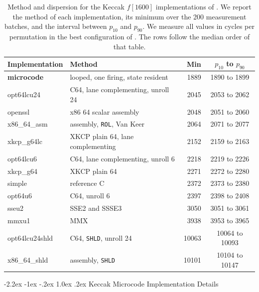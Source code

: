 \documentclass[journal=tches,submission]{iacrtrans}
\makeatletter
\renewcommand\subsection{\@startsection{subsection}{2}{\z@}%
      {-2.2ex \@plus -1ex \@minus -.2ex}%
      {1.0ex \@plus .2ex}%
      {\normalfont\large\bfseries\SS@subsectfont}}
\makeatother
\begin{document}
\begin{table}[!ht]
\centering
\caption{Method and dispersion for the Keccak $f[1600]$ implementations of
. We report the method of each implementation, its
minimum over the 200 measurement batches, and the interval between $p_{10}$ and
$p_{90}$. We measure all values in cycles per permutation in the best
configuration of . The rows follow the median order of
that table.}
\label{tab:res-keccak-dispersion}
\footnotesize
\setlength{\tabcolsep}{4pt}
\begin{tabular}{@{}llrc@{}}
\toprule
Implementation & Method & Min & $p_{10}$ to $p_{90}$ \\
\midrule
\textbf{microcode} & looped, one firing, state resident & 1889 & 1890 to 1899 \\
\midrule
opt64lcu24        & C64, lane complementing, unroll 24 & 2045 & 2053 to 2062 \\
openssl           & x86 64 scalar assembly             & 2048 & 2051 to 2060 \\
x86\_64\_asm      & assembly, \texttt{ROL}, Van Keer   & 2064 & 2071 to 2077 \\
xkcp\_g64lc       & XKCP plain 64, lane complementing  & 2152 & 2159 to 2163 \\
opt64lcu6         & C64, lane complementing, unroll 6  & 2218 & 2219 to 2226 \\
xkcp\_g64         & XKCP plain 64                      & 2271 & 2272 to 2280 \\
simple            & reference C                        & 2372 & 2373 to 2380 \\
opt64u6           & C64, unroll 6                      & 2397 & 2398 to 2408 \\
sseu2             & SSE2 and SSSE3                     & 3050 & 3051 to 3061 \\
mmxu1             & MMX                                & 3938 & 3953 to 3965 \\
opt64lcu24shld    & C64, \texttt{SHLD}, unroll 24      & 10063 & 10064 to 10093 \\
x86\_64\_shld     & assembly, \texttt{SHLD}            & 10101 & 10104 to 10147 \\
\bottomrule
\end{tabular}
\end{table}

\subsection{Keccak Microcode Implementation Details}
\label{appkeccakdetails}
\end{document}
